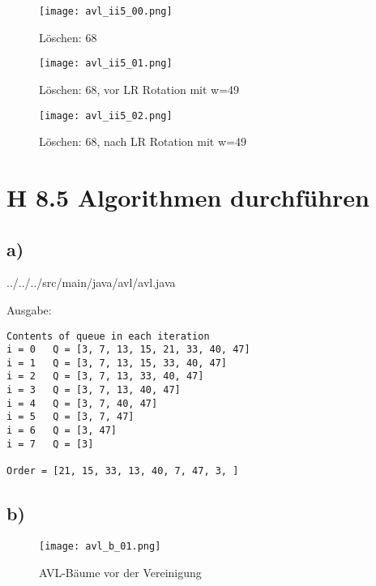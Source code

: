 \documentclass[a4paper]{article}
\begin{document}
\begin{figure}[!h]
	\begin{center}
		\texttt{[image: avl\_ii5\_00.png]}
	\end{center}
	\caption{Löschen: 68}
	\label{fig:avl_ii5_00}
\end{figure}

\begin{figure}[!h]
	\begin{center}
		\texttt{[image: avl\_ii5\_01.png]}
	\end{center}
	\caption{Löschen: 68, vor LR Rotation mit w=49}
	\label{fig:avl_ii5_01}
\end{figure}

\begin{figure}[!h]
	\begin{center}
		\texttt{[image: avl\_ii5\_02.png]}
	\end{center}
	\caption{Löschen: 68, nach LR Rotation mit w=49}
	\label{fig:avl_ii5_02}
\end{figure}

\clearpage
\section*{H 8.5 Algorithmen durchführen}
\subsection*{a)}


	{../../../src/main/java/avl/avl.java}

\clearpage
Ausgabe:
\begin{verbatim}
Contents of queue in each iteration
i = 0	Q = [3, 7, 13, 15, 21, 33, 40, 47]
i = 1	Q = [3, 7, 13, 15, 33, 40, 47]
i = 2	Q = [3, 7, 13, 33, 40, 47]
i = 3	Q = [3, 7, 13, 40, 47]
i = 4	Q = [3, 7, 40, 47]
i = 5	Q = [3, 7, 47]
i = 6	Q = [3, 47]
i = 7	Q = [3]

Order = [21, 15, 33, 13, 40, 7, 47, 3, ]
\end{verbatim}

\subsection*{b)}

\begin{figure}[!h]
	\begin{center}
		\texttt{[image: avl\_b\_01.png]}
	\end{center}
	\caption{AVL-Bäume vor der Vereinigung}
	\label{fig:befor_union}
\end{figure}
\end{document}

